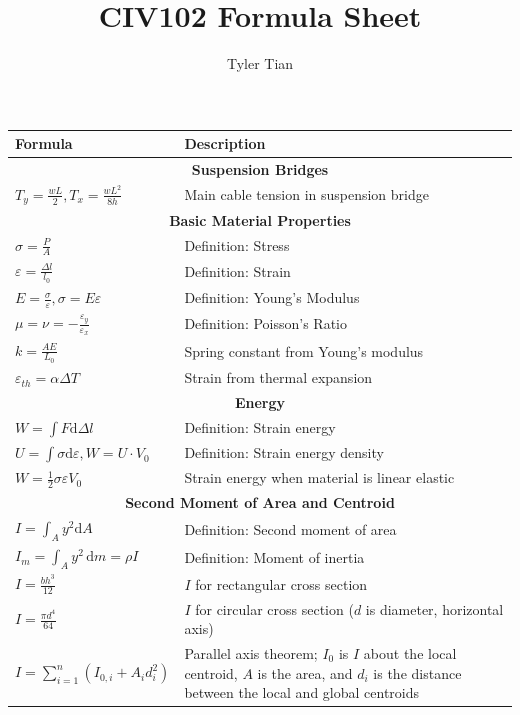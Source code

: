 \documentclass[twocolumn]{article}
\title{CIV102 Formula Sheet}
\author{Tyler Tian}
\newcommand{\dd}[1]{\mathrm{d}#1}
\newcommand{\formulasection}[1]{\multicolumn{2}{c}{\textbf{#1}}}
\begin{document}
\begin{tabularx}{\linewidth}{l X}
    Formula & Description \\
    \hline
    \hline
    \formulasection{Suspension Bridges} \\
    \rule{0pt}{4ex}\(T_y = \frac{wL}{2}, T_x = \frac{wL^2}{8h}\) & Main cable tension in suspension bridge \\
    \hline
    \formulasection{Basic Material Properties} \\
    \rule{0pt}{4ex}\(\sigma = \frac{P}{A}\) & Definition: Stress \\
    \rule{0pt}{4ex}\(\varepsilon = \frac{\Delta l}{l_0}\) & Definition: Strain \\
    \rule{0pt}{4ex}\(E = \frac{\sigma}{\varepsilon}, \sigma = E\varepsilon\) & Definition: Young's Modulus \\
    \(\mu = \nu = -\frac{\varepsilon_y}{\varepsilon_x}\) & Definition: Poisson's Ratio \\
    \rule{0pt}{4ex}\(k = \frac{AE}{L_0}\) & Spring constant from Young's modulus \\
    \(\varepsilon_{th} = \alpha\Delta T\) & Strain from thermal expansion \\
    \hline
    \formulasection{Energy} \\
    \rule{0pt}{4ex}\(W = \int F\dd\Delta l\) & Definition: Strain energy \\
    \rule{0pt}{4ex}\(U = \int \sigma\dd\varepsilon, W = U \cdot V_0\) & Definition: Strain energy density \\
    \(W = \frac{1}{2}\sigma\varepsilon V_0\) & Strain energy when material is linear elastic \\
    \hline
    \formulasection{Second Moment of Area and Centroid} \\
    \rule{0pt}{4ex}\(I = \int_A y^2\dd A\) & Definition: Second moment of area \\
    \(I_m = \int_A y^2\,\dd m = \rho I\) & Definition: Moment of inertia \\
    \rule{0pt}{4ex}\(I = \frac{bh^3}{12}\) & \(I\) for rectangular cross section \\
    \rule{0pt}{4ex}\(I = \frac{\pi d^4}{64}\) & \(I\) for circular cross section (\(d\) is diameter, horizontal axis) \\
    \(I = \sum_{i = 1}^n (I_{0,i} + A_id_i^2)\) & Parallel axis theorem; \(I_0\) is \(I\) about the local centroid,
        \(A\) is the area, and \(d_i\) is the distance between the local and global centroids \\

\end{tabularx}
\end{document}
